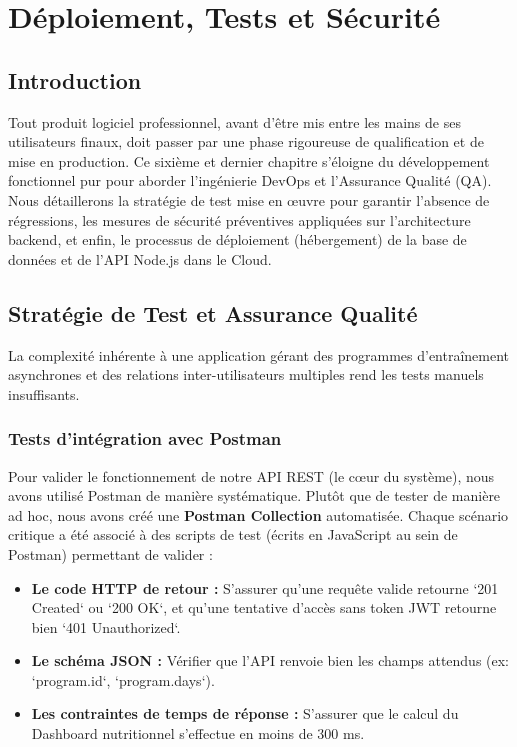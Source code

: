 \chapter{Déploiement, Tests et Sécurité} 
\minitoc
\newpage

\section{Introduction}
Tout produit logiciel professionnel, avant d'être mis entre les mains de ses utilisateurs finaux, doit passer par une phase rigoureuse de qualification et de mise en production. Ce sixième et dernier chapitre s'éloigne du développement fonctionnel pur pour aborder l'ingénierie DevOps et l'Assurance Qualité (QA). Nous détaillerons la stratégie de test mise en œuvre pour garantir l'absence de régressions, les mesures de sécurité préventives appliquées sur l'architecture backend, et enfin, le processus de déploiement (hébergement) de la base de données et de l'API Node.js dans le Cloud.

\section{Stratégie de Test et Assurance Qualité}
La complexité inhérente à une application gérant des programmes d'entraînement asynchrones et des relations inter-utilisateurs multiples rend les tests manuels insuffisants.

\subsection{Tests d'intégration avec Postman}
Pour valider le fonctionnement de notre API REST (le cœur du système), nous avons utilisé Postman de manière systématique.
Plutôt que de tester de manière ad hoc, nous avons créé une \textbf{Postman Collection} automatisée. Chaque scénario critique a été associé à des scripts de test (écrits en JavaScript au sein de Postman) permettant de valider :
\begin{itemize}
    \item \textbf{Le code HTTP de retour :} S'assurer qu'une requête valide retourne `201 Created` ou `200 OK`, et qu'une tentative d'accès sans token JWT retourne bien `401 Unauthorized`.
    \item \textbf{Le schéma JSON :} Vérifier que l'API renvoie bien les champs attendus (ex: `program.id`, `program.days`).
    \item \textbf{Les contraintes de temps de réponse :} S'assurer que le calcul du Dashboard nutritionnel s'effectue en moins de 300 ms.
\end{itemize}

